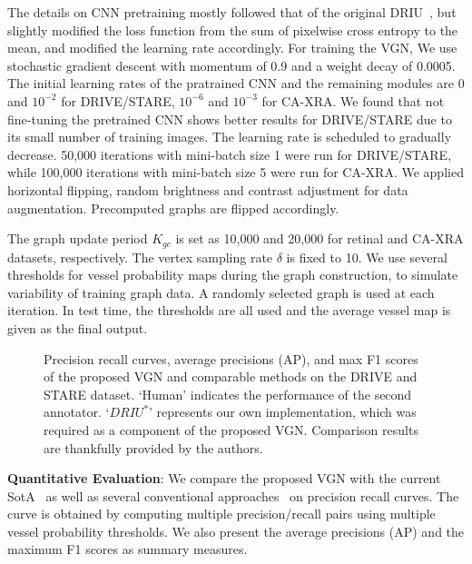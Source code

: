 \documentclass[runningheads,a4paper]{llncs}
\begin{document}
The details on CNN pretraining mostly followed that of the original DRIU~\cite{maninis16}, but slightly modified the loss function from the sum of pixelwise cross entropy to the mean, and modified the learning rate accordingly. For training the VGN, We use stochastic gradient descent with momentum of 0.9 and a weight decay of 0.0005. The initial learning rates of the pratrained CNN and the remaining modules are $0$ and $10^{-2}$ for DRIVE/STARE, $10^{-6}$ and $10^{-3}$ for CA-XRA. We found that not fine-tuning the pretrained CNN shows better results for DRIVE/STARE due to its small number of training images. The learning rate is scheduled to gradually decrease. 50,000 iterations with mini-batch size 1 were run for DRIVE/STARE, while 100,000 iterations with mini-batch size 5 were run for CA-XRA. We applied horizontal flipping, random brightness and contrast adjustment for data augmentation. Precomputed graphs are flipped accordingly. 

The graph update period $K_{gc}$ is set as 10,000 and 20,000 for retinal and CA-XRA datasets, respectively. The vertex sampling rate $\delta$ is fixed to 10. We use several thresholds for vessel probability maps during the graph construction, to simulate variability of training graph data. A randomly selected graph is used at each iteration.
In test time, the thresholds are all used and the average vessel map is given as the final output.

\begin{figure*}[t]
	\centering
	\begin{minipage}{1\linewidth}
	\end{minipage}
	\caption{Precision recall curves, average precisions (AP), and max F1 scores of the proposed VGN and comparable methods on the DRIVE and STARE dataset. `Human' indicates the performance of the second annotator. `$DRIU^{*}$' represents our own implementation, which was required as a component of the proposed VGN. Comparison results are thankfully provided by the authors.}
	\label{fig:quan_res}
\end{figure*}

\textbf{Quantitative Evaluation}:
We compare the proposed VGN with the current SotA~\cite{maninis16,ganin14,fu16} as well as several conventional approaches~\cite{soares06,orlando14,becker13} on precision recall curves. The curve is obtained by computing multiple precision/recall pairs using multiple vessel probability thresholds. We also present the average precisions (AP) and the maximum F1 scores as summary measures. 
\end{document}
